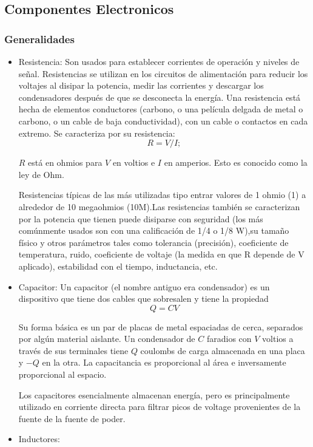 		\subsection{Componentes Electronicos}
			\subsubsection{Generalidades}
			\begin{itemize}
				\item Resistencia: 
				Son usados para establecer corrientes de operación y niveles de señal. Resistencias se utilizan en los circuitos de alimentación para reducir los voltajes al disipar la potencia, medir las corrientes y descargar los condensadores después de que se desconecta la energía. Una resistencia está hecha de elementos conductores (carbono, o una película delgada de metal o carbono, o un cable de baja conductividad), con un cable o contactos en cada extremo. Se caracteriza por su resistencia:
				$$R = V/I;$$
				
				\par \noindent
				$R$ está en ohmios para $V$ en voltios e $I$ en amperios. Esto es conocido
				como la ley de Ohm.
				
				\par \noindent
				Resistencias típicas de las más utilizadas
				tipo entrar
				valores de 1 ohmio (1) a alrededor de 10 megaohmios (10M).Las resistencias también se caracterizan por la potencia que tienen
				puede disiparse con seguridad (los más comúnmente usados son con una calificación de 1/4 o 1/8 W),su tamaño físico y otros parámetros tales como tolerancia (precisión), coeficiente de temperatura, ruido, coeficiente de voltaje (la medida en que R
				depende de V aplicado), estabilidad con el tiempo, inductancia, etc.
				
				\item Capacitor: 
				Un capacitor (el nombre antiguo era
				condensador) es un dispositivo que tiene dos cables que sobresalen
				y tiene la propiedad
				$$Q = CV$$ 
				\par \noindent
				Su forma básica es un par de placas de metal espaciadas de cerca, separados por algún material aislante. Un condensador de $C$ faradios con $V$ voltios a través de sus terminales tiene $Q$ coulombs de carga almacenada en una placa y $-Q$ en la otra. La capacitancia es proporcional al área e inversamente proporcional al espacio.
				
				\par \noindent
				Los capacitores esencialmente almacenan energía, pero es principalmente utilizado en corriente directa para filtrar picos de voltage provenientes de la fuente de la fuente de poder.
				
				\newpage
				\thispagestyle{plain}
				
				\item Inductores:
				
				
			\end{itemize}
		
